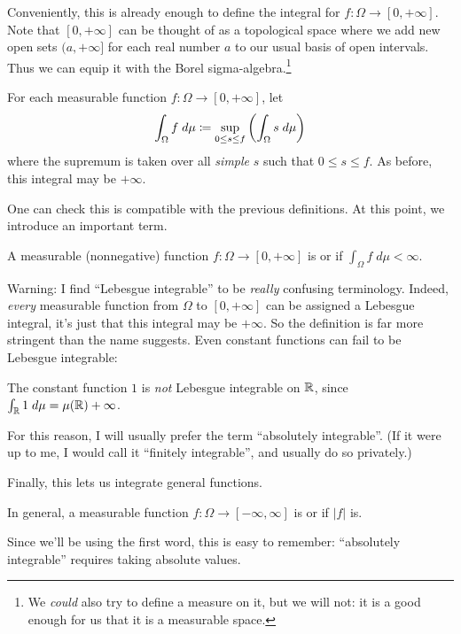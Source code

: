 Conveniently, this is already enough to define the integral
for $f \colon \Omega \to [0, +\infty]$.
Note that $[0,+\infty]$ can be thought of as a topological space
where we add new open sets $(a,+\infty]$ %
for each real number $a$ to our usual basis of open intervals.
Thus we can equip it with the Borel sigma-algebra.\footnote{We
	\emph{could} also try to define a measure on it,
	but we will not: it is a good enough for us
	that it is a measurable space.}
\begin{step}
	For each measurable function $f \colon \Omega \to [0, +\infty]$, let
	\[ \int_\Omega f \; d\mu \coloneqq
		\sup_{0 \le s \le f} \left( \int_\Omega s \; d\mu \right) \]
	where the supremum is taken over all \emph{simple} $s$
	such that $0 \le s \le f$.
	As before, this integral may be $+\infty$.
\end{step}
One can check this is compatible with the previous definitions.
At this point, we introduce an important term.
\begin{definition}
	A measurable (nonnegative) function
	$f \colon \Omega \to [0, +\infty]$
	is  or 
	if $\int_\Omega f \; d\mu < \infty$.
\end{definition}
Warning: I find ``Lebesgue integrable'' to be \emph{really} confusing terminology.
Indeed, \emph{every} measurable function from $\Omega$ to $[0,+\infty]$
can be assigned a Lebesgue integral, it's just that
this integral may be $+\infty$.
So the definition is far more stringent than the name suggests.
Even constant functions can fail to be Lebesgue integrable:
\begin{example}
	The constant function $1$ is \emph{not}
	Lebesgue integrable on $\mathbb R$,
	since $\int_\mathbb R 1 \; d\mu = \mu(\mathbb R) +\infty$.
\end{example}
For this reason, I will usually prefer the term ``absolutely integrable''.
(If it were up to me, I would call it ``finitely integrable'',
and usually do so privately.)

Finally, this lets us integrate general functions.
\begin{definition}
	In general, a measurable function $f \colon \Omega \to [-\infty, \infty]$
	is  or  if $|f|$ is.
\end{definition}
Since we'll be using the first word, this is easy to remember:
``absolutely integrable'' requires taking absolute values.

